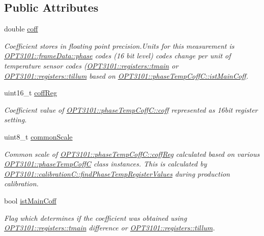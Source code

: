 \subsection*{Public Attributes}
\begin{DoxyCompactItemize}
\item 
double \mbox{\hyperlink{class_o_p_t3101_1_1phase_temp_coff_c_ade7d29c7cac1e63af7910eec0ec38043}{coff}}
\begin{DoxyCompactList}\small\item\em Coefficient stores in floating point precision.\+Units for this measurement is \mbox{\hyperlink{class_o_p_t3101_1_1frame_data_af8661d11405953dc378ad4d7cb0f2db6}{O\+P\+T3101\+::frame\+Data\+::phase}} codes (16 bit level) codes change per unit of temperature sensor codes (\mbox{\hyperlink{class_o_p_t3101_1_1registers_a3dfd8d81d4cb04d274007deb7c6122fc}{O\+P\+T3101\+::registers\+::tmain}} or \mbox{\hyperlink{class_o_p_t3101_1_1registers_a8a097a41ecdf2b98226c4a3a92121c12}{O\+P\+T3101\+::registers\+::tillum}} based on \mbox{\hyperlink{class_o_p_t3101_1_1phase_temp_coff_c_abcd691cfc4678e3588bc1b38600632e7}{O\+P\+T3101\+::phase\+Temp\+Coff\+C\+::ist\+Main\+Coff}}. \end{DoxyCompactList}\item 
uint16\+\_\+t \mbox{\hyperlink{class_o_p_t3101_1_1phase_temp_coff_c_a69e1782e097ce7ab761e4e55b5206f2e}{coff\+Reg}}
\begin{DoxyCompactList}\small\item\em Coefficient value of \mbox{\hyperlink{class_o_p_t3101_1_1phase_temp_coff_c_ade7d29c7cac1e63af7910eec0ec38043}{O\+P\+T3101\+::phase\+Temp\+Coff\+C\+::coff}} represented as 16bit register setting. \end{DoxyCompactList}\item 
uint8\+\_\+t \mbox{\hyperlink{class_o_p_t3101_1_1phase_temp_coff_c_a0f7646d71d058bc5354ac8f14270fcf3}{common\+Scale}}
\begin{DoxyCompactList}\small\item\em Common scale of \mbox{\hyperlink{class_o_p_t3101_1_1phase_temp_coff_c_a69e1782e097ce7ab761e4e55b5206f2e}{O\+P\+T3101\+::phase\+Temp\+Coff\+C\+::coff\+Reg}} calculated based on various \mbox{\hyperlink{class_o_p_t3101_1_1phase_temp_coff_c}{O\+P\+T3101\+::phase\+Temp\+CoffC}} class instances. This is calculated by \mbox{\hyperlink{class_o_p_t3101_1_1calibration_c_a5ca75c8e4d7818a90cacc0471522b365}{O\+P\+T3101\+::calibration\+C\+::find\+Phase\+Temp\+Register\+Values}} during production calibration. \end{DoxyCompactList}\item 
bool \mbox{\hyperlink{class_o_p_t3101_1_1phase_temp_coff_c_abcd691cfc4678e3588bc1b38600632e7}{ist\+Main\+Coff}}
\begin{DoxyCompactList}\small\item\em Flag which determines if the coefficient was obtained using \mbox{\hyperlink{class_o_p_t3101_1_1registers_a3dfd8d81d4cb04d274007deb7c6122fc}{O\+P\+T3101\+::registers\+::tmain}} difference or \mbox{\hyperlink{class_o_p_t3101_1_1registers_a8a097a41ecdf2b98226c4a3a92121c12}{O\+P\+T3101\+::registers\+::tillum}}. \end{DoxyCompactList}\end{DoxyCompactItemize}
